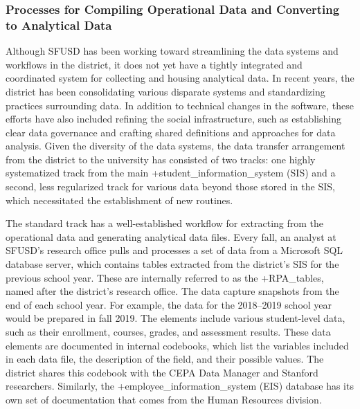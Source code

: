 \documentclass[
]{WileySix}
\begin{document}
\hypertarget{processes-for-compiling-operational-data-and-converting-to-analytical-data}{%
\subsubsection{Processes for Compiling Operational Data and Converting to Analytical Data}\label{processes-for-compiling-operational-data-and-converting-to-analytical-data}}

Although SFUSD has been working toward streamlining the data systems and workflows in the district, it does not yet have a tightly integrated and coordinated system for collecting and housing analytical data. In recent years, the district has been consolidating various disparate systems and standardizing practices surrounding data. In addition to technical changes in the software, these efforts have also included refining the social infrastructure, such as establishing clear data governance and crafting shared definitions and approaches for data analysis. Given the diversity of the data systems, the data transfer arrangement from the district to the university has consisted of two tracks: one highly systematized track from the main +student\_information\_system\textbar{} (SIS) and a second, less regularized track for various data beyond those stored in the SIS, which necessitated the establishment of new routines.

The standard track has a well-established workflow for extracting from the operational data and generating analytical data files. Every fall, an analyst at SFUSD's research office pulls and processes a set of data from a Microsoft SQL database server, which contains tables extracted from the district's SIS for the previous school year. These are internally referred to as the +RPA\_tables\textbar, named after the district's research office. The data capture snapshots from the end of each school year. For example, the data for the 2018--2019 school year would be prepared in fall 2019. The elements include various student-level data, such as their enrollment, courses, grades, and assessment results. These data elements are documented in internal codebooks, which list the variables included in each data file, the description of the field, and their possible values. The district shares this codebook with the CEPA Data Manager and Stanford researchers. Similarly, the +employee\_information\_system\textbar{} (EIS) database has its own set of documentation that comes from the Human Resources division.
\end{document}

